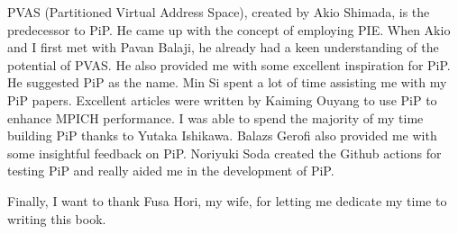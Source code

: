 
PVAS (Partitioned Virtual Address Space), created by Akio Shimada, is
the predecessor to PiP. He came up with the concept of employing
PIE. When Akio and I first met with Pavan Balaji, he already had a
keen understanding of the potential of PVAS. He also provided me with
some excellent inspiration for PiP. He suggested PiP as the name. Min
Si spent a lot of time assisting me with my PiP papers. Excellent
articles were written by Kaiming Ouyang to use PiP to enhance MPICH
performance. I was able to spend the majority of my time building PiP
thanks to Yutaka Ishikawa. Balazs Gerofi also provided me with some
insightful feedback on PiP. Noriyuki Soda created the Github actions
for testing PiP and really aided me in the development of PiP.  

Finally, I want to thank Fusa Hori, my wife, for letting me dedicate
my time to writing this book.
